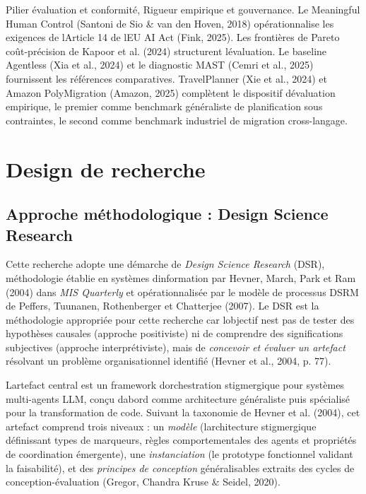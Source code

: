 \documentclass[12pt,a4paper]{article}
\begin{document}
Pilier évaluation et conformité, Rigueur empirique et gouvernance.
Le Meaningful Human Control (Santoni de Sio \& van den Hoven, 2018)
opérationnalise les exigences de l\textquotesingle Article 14 de
l\textquotesingle EU AI Act (Fink, 2025). Les frontières de Pareto
coût-précision de Kapoor et al. (2024) structurent
l\textquotesingle évaluation. Le baseline Agentless (Xia et al., 2024)
et le diagnostic MAST (Cemri et al., 2025) fournissent les références
comparatives. TravelPlanner (Xie et al., 2024) et Amazon PolyMigration
(Amazon, 2025) complètent le dispositif d\textquotesingle évaluation
empirique, le premier comme benchmark généraliste de planification sous
contraintes, le second comme benchmark industriel de migration
cross-langage.

\section{Design de recherche}\label{design-de-recherche}

\subsection{Approche méthodologique : Design Science Research}\label{approche-muxe9thodologique--design-science-research}

Cette recherche adopte une démarche de \emph{Design Science Research}
(DSR), méthodologie établie en systèmes d\textquotesingle information par
Hevner, March, Park et Ram (2004) dans \emph{MIS Quarterly} et
opérationnalisée par le modèle de processus DSRM de Peffers, Tuunanen,
Rothenberger et Chatterjee (2007). Le DSR est la méthodologie appropriée
pour cette recherche car l\textquotesingle objectif n\textquotesingle est
pas de tester des hypothèses causales (approche positiviste) ni de
comprendre des significations subjectives (approche interprétiviste),
mais de \emph{concevoir et évaluer un artefact} résolvant un problème
organisationnel identifié (Hevner et al., 2004, p. 77).

L\textquotesingle artefact central est un framework
d\textquotesingle orchestration stigmergique pour systèmes multi-agents
LLM, conçu d\textquotesingle abord comme architecture généraliste puis
spécialisé pour la transformation de code. Suivant la taxonomie de
Hevner et al. (2004), cet artefact comprend trois niveaux :
un \emph{modèle} (l\textquotesingle architecture stigmergique définissant
types de marqueurs, règles comportementales des agents et propriétés
de coordination émergente), une \emph{instanciation} (le prototype
fonctionnel validant la faisabilité), et des \emph{principes de
conception} généralisables extraits des
cycles de conception-évaluation (Gregor, Chandra Kruse \& Seidel, 2020).
\end{document}
